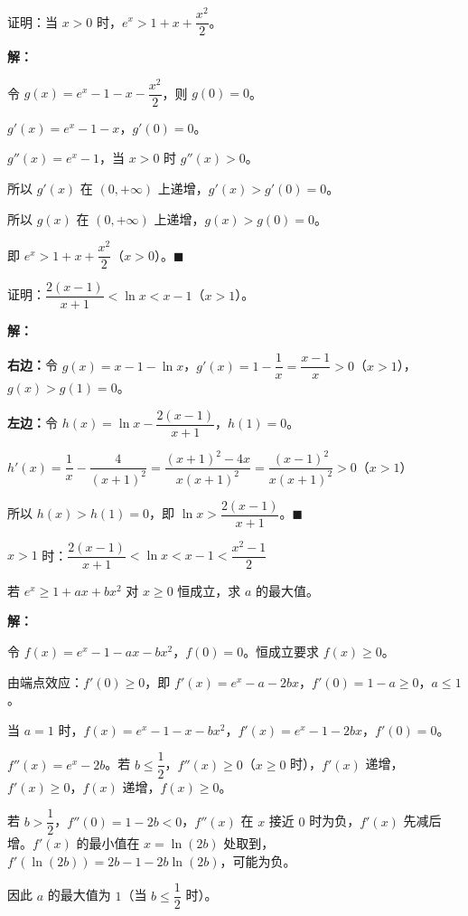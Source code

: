 \documentclass[12pt, a4paper]{ctexart}
\begin{document}
\begin{examplebox}[【例题4】切线放缩证明不等式]
证明：当 $x>0$ 时，$e^x > 1+x+\dfrac{x^2}{2}$。

\textbf{解：}

令 $g(x)=e^x - 1 - x - \dfrac{x^2}{2}$，则 $g(0)=0$。

$g'(x)=e^x - 1 - x$，$g'(0)=0$。

$g''(x)=e^x - 1$，当 $x>0$ 时 $g''(x)>0$。

所以 $g'(x)$ 在 $(0,+\infty)$ 上递增，$g'(x)>g'(0)=0$。

所以 $g(x)$ 在 $(0,+\infty)$ 上递增，$g(x)>g(0)=0$。

即 $e^x > 1+x+\dfrac{x^2}{2}$（$x>0$）。$\blacksquare$
\end{examplebox}

\begin{examplebox}
证明：$\dfrac{2(x-1)}{x+1} < \ln x < x-1$（$x>1$）。

\textbf{解：}

\textbf{右边：}令 $g(x)=x-1-\ln x$，$g'(x)=1-\dfrac{1}{x}=\dfrac{x-1}{x}>0$（$x>1$），$g(x)>g(1)=0$。

\textbf{左边：}令 $h(x)=\ln x - \dfrac{2(x-1)}{x+1}$，$h(1)=0$。

$h'(x)=\dfrac{1}{x}-\dfrac{4}{(x+1)^2}=\dfrac{(x+1)^2-4x}{x(x+1)^2}=\dfrac{(x-1)^2}{x(x+1)^2}>0$（$x>1$）

所以 $h(x)>h(1)=0$，即 $\ln x > \dfrac{2(x-1)}{x+1}$。$\blacksquare$

\begin{tipbox}[放缩链]
$x>1$ 时：$\dfrac{2(x-1)}{x+1} < \ln x < x-1 < \dfrac{x^2-1}{2}$
\end{tipbox}
\end{examplebox}

\begin{examplebox}[【例题6】端点效应——$f(0)=0$ 型]
若 $e^x \geq 1+ax+bx^2$ 对 $x\geq 0$ 恒成立，求 $a$ 的最大值。

\textbf{解：}

令 $f(x)=e^x-1-ax-bx^2$，$f(0)=0$。恒成立要求 $f(x)\geq 0$。

由端点效应：$f'(0)\geq 0$，即 $f'(x)=e^x-a-2bx$，$f'(0)=1-a\geq 0$，$a\leq 1$。

当 $a=1$ 时，$f(x)=e^x-1-x-bx^2$，$f'(x)=e^x-1-2bx$，$f'(0)=0$。

$f''(x)=e^x-2b$。若 $b\leq \dfrac{1}{2}$，$f''(x)\geq 0$（$x\geq 0$ 时），$f'(x)$ 递增，$f'(x)\geq 0$，$f(x)$ 递增，$f(x)\geq 0$。

若 $b>\dfrac{1}{2}$，$f''(0)=1-2b<0$，$f''(x)$ 在 $x$ 接近 $0$ 时为负，$f'(x)$ 先减后增。$f'(x)$ 的最小值在 $x=\ln(2b)$ 处取到，$f'(\ln(2b))=2b-1-2b\ln(2b)$，可能为负。

因此 $a$ 的最大值为 $\boxed{1}$（当 $b\leq \dfrac{1}{2}$ 时）。
\end{examplebox}
\end{document}
